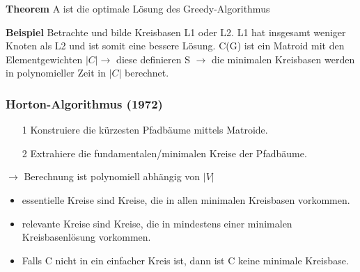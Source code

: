 \textbf{Theorem} \newline A ist die optimale Lösung des Greedy-Algorithmus \newline

\textbf{Beispiel} \newline Betrachte und bilde Kreisbasen L1 oder L2. L1 hat insgesamt weniger Knoten als L2 und ist somit eine bessere Lösung. C(G) ist ein Matroid mit den Elementgewichten $|C| \rightarrow$ diese definieren S $\rightarrow$ die minimalen Kreisbasen werden in polynomieller Zeit in $|C|$ berechnet.
\subsubsection{Horton-Algorithmus (1972)}
\begin{itemize}
	\item[1]Konstruiere die kürzesten Pfadbäume mittels Matroide. 
	\item[2]Extrahiere die fundamentalen/minimalen Kreise der Pfadbäume.
\end{itemize}
$\rightarrow$ Berechnung ist polynomiell abhängig von $|V|$
\begin{itemize}
	\item essentielle Kreise sind Kreise, die in allen minimalen Kreisbasen vorkommen. 
	\item relevante Kreise sind Kreise, die in mindestens einer minimalen Kreisbasenlösung vorkommen.
	\item Falls C nicht in ein einfacher Kreis ist, dann ist C keine minimale Kreisbase.
\end{itemize}